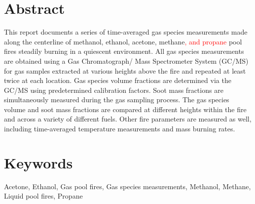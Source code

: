 \documentclass[12pt]{article}
\begin{document}
\section*{Abstract}
This report documents a series of time-averaged gas species measurements made along the centerline of methanol, ethanol, acetone, methane\textcolor{red}{, and propane} pool fires steadily burning in a quiescent environment. All gas species measurements are obtained using a Gas Chromatograph/ Mass Spectrometer System (GC/MS) for gas samples extracted at various heights above the fire and repeated at least twice at each location. Gas species volume fractions are determined via the GC/MS using predetermined calibration factors. Soot mass fractions are simultaneously measured during the gas sampling process. The gas species volume and soot mass fractions are compared at different heights within the fire and across a variety of different fuels. Other fire parameters are measured as well, including time-averaged temperature measurements and mass burning rates.
\section*{Keywords}
\normalsize Acetone, Ethanol, Gas pool fires, Gas species measurements, Methanol, Methane, Liquid pool fires, Propane\\
\pagebreak

\tableofcontents
	
\pagebreak

\listoftables
\pagebreak
\listoffigures
\end{document}
